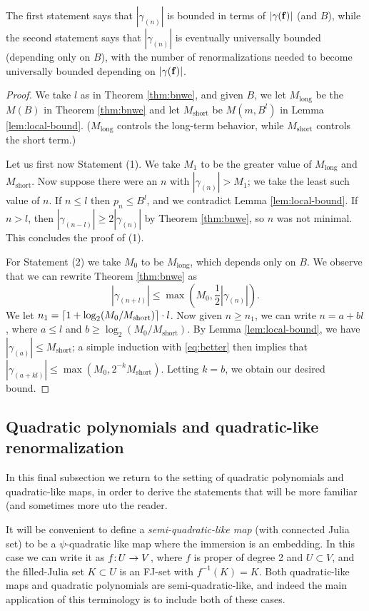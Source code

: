 \newcommand{\mlong}{M_{\text{long}}}
\newcommand{\mshort}{M_{\text{short}}}

The first statement says that $| \gamma_{(n)} |$ is bounded in terms of $| \gamma(\mathbf f) |$ (and $B$),
while the second statement says that $| \gamma_{(n)} |$ is eventually universally bounded (depending only on $B$),
with the number of renormalizations needed to become universally bounded depending on $| \gamma(\mathbf f) |$. 

\begin{proof}
We take $l$ as in Theorem \ref{thm:bnwe},
and given $B$,
we let $\mlong$ be the $M(B)$ in Theorem \ref{thm:bnwe} 
and let $\mshort$ be $M(m, B^l)$ in Lemma \ref{lem:local-bound}.
($\mlong$ controls the long-term behavior, while $\mshort$ controls the short term.)

Let us first now Statement (1).
We take $M_1$ to be the greater value of $\mlong$ and $\mshort$.
Now suppose there were an $n$ with $|\gamma_{(n)}| > M_1$;
we take the least such value of $n$.
If $n \le l$ then $p_n \le B^l$,
and we contradict Lemma \ref{lem:local-bound}.
If $n > l$, 
then $|\gamma_{{(n-l)}}| \ge 2|\gamma_{(n)}|$ by Theorem \ref{thm:bnwe},
so $n$ was not minimal. 
This concludes the proof of (1).

For Statement (2) we take $M_0$ to be $\mlong$, which depends only on $B$.
We observe that we can rewrite Theorem \ref{thm:bnwe} as
\begin{equation} \label{eq:better}
| \gamma_{(n + l)} | \le \max(M_0, \frac12 | \gamma_{(n)} |).
\end{equation}
We let $n_1 = \ceil{1 + \log_2(M_0/\mshort)}\cdot l$. 
Now given $n \ge n_1$,
we can write $n = a + b l$,
where $a \le l$ and $b \ge \log_2(M_0/\mshort)$.
By Lemma \ref{lem:local-bound},
we have $| \gamma_{(a)} | \le \mshort$;
a simple induction with \eqref{eq:better} then implies that $| \gamma_{(a + kl)} | \le \max(M_0, 2^{-k} \mshort)$.
Letting $k = b$, we obtain our desired bound.
\end{proof}

\subsection{Quadratic polynomials and quadratic-like renormalization}
In this final subsection we return to the setting of quadratic polynomials and quadratic-like maps,
in order to derive the statements that will be more familiar (and sometimes more uto the reader. 

It will be convenient to define a \emph{semi-quadratic-like map} (with connected Julia set) to be a $\psi$-quadratic like map where the immersion is an embedding. In this case we can write it as $f\mathpunct: U \to V$,
where $f$ is proper of degree 2 and $U \subset V$,
and the filled-Julia set $K \subset U$ is an FJ-set with $f^{-1}(K) = K$. 
Both quadratic-like maps and quadratic polynomials are semi-quadratic-like,
and indeed the main application of this terminology is to include both of these cases. 

